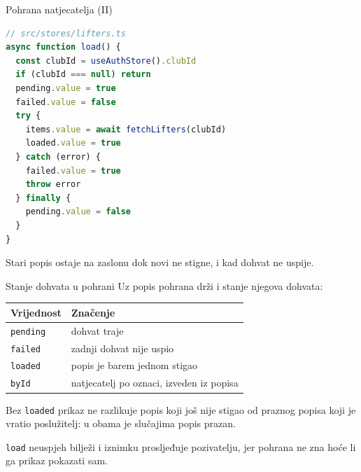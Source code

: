 \begin{frame}[fragile]{Pohrana natjecatelja (II)}
\vspace{-0.3em}
\begin{lstlisting}[language=typescript]
// src/stores/lifters.ts
async function load() {
  const clubId = useAuthStore().clubId
  if (clubId === null) return
  pending.value = true
  failed.value = false
  try {
    items.value = await fetchLifters(clubId)
    loaded.value = true
  } catch (error) {
    failed.value = true
    throw error
  } finally {
    pending.value = false
  }
}
\end{lstlisting}

\vspace{0.1em}
Stari popis ostaje na zaslonu dok novi ne stigne, i kad dohvat ne uspije.
\end{frame}

\begin{frame}{Stanje dohvata u pohrani}
Uz popis pohrana drži i stanje njegova dohvata:

\vspace{0.6em}
\begin{center}
{\small
\setlength{\tabcolsep}{6pt}
\renewcommand{\arraystretch}{1.35}
\begin{tabular}{@{}L{2.2cm}L{8.4cm}@{}}
  \toprule
  \textbf{Vrijednost} & \textbf{Značenje} \\
  \midrule
  \texttt{pending} & dohvat traje \\
  \texttt{failed} & zadnji dohvat nije uspio \\
  \texttt{loaded} & popis je barem jednom stigao \\
  \texttt{byId} & natjecatelj po oznaci, izveden iz popisa \\
  \bottomrule
\end{tabular}
}
\end{center}

\vspace{0.6em}
Bez \texttt{loaded} prikaz ne razlikuje popis koji još nije stigao od praznog popisa koji je vratio poslužitelj: u obama je slučajima popis prazan.

\vspace{0.5em}
\texttt{load} neuspjeh bilježi i iznimku prosljeđuje pozivatelju, jer pohrana ne zna hoće li ga prikaz pokazati sam.
\end{frame}

